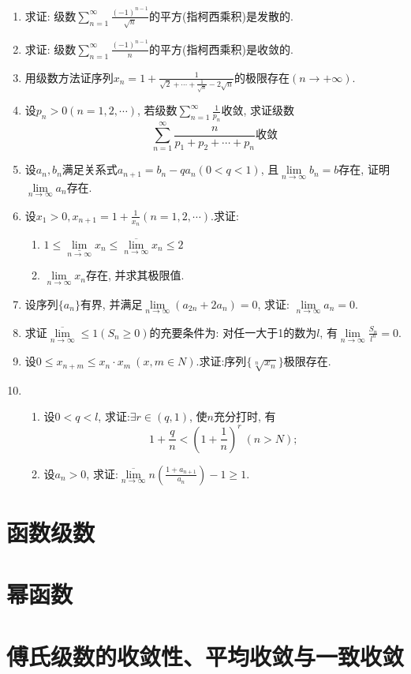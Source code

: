 \begin{enumerate}
\begin{enumerate}
\end{enumerate}
\item 求证: 级数$\sum\limits_{n=1}^{\infty}\frac{(-1)^{n-1}}{\sqrt{n}}$的平方(指柯西乘积)是发散的.
\item 求证: 级数$\sum\limits_{n=1}^{\infty}\frac{(-1)^{n-1}}{n}$的平方(指柯西乘积)是收敛的.
\item 用级数方法证序列$x_n=1+\frac{1}{\sqrt{2}+\cdots+\frac{1}{\sqrt{n}}-2\sqrt{n}}$的极限存在$(n\rightarrow +\infty)$.
\item 设$p_n>0(n=1,2,\cdots)$, 若级数$\sum\limits_{n=1}^{\infty}\frac{1}{p_n}$收敛, 求证级数
$$ \sum\limits_{n=1}^{\infty}\frac{n}{p_1+p_2+\cdots+p_n}\textbf{收敛}$$
\item 设${a_n},{b_n}$满足关系式$a_{n+1}=b_n-qa_n(0<q<1)$, 且$\lim\limits_{n\rightarrow \infty}b_n=b$存在, 证明$\lim\limits_{n\rightarrow \infty}a_n$存在.
\item 设$x_1>0,x_{n+1}=1+\frac{1}{x_n}(n=1,2,\cdots)$.求证:
\begin{enumerate}
	\item $1\le \underset{n\rightarrow \infty}{\underline{\lim}}x_n\le \overline{\lim\limits_{n\rightarrow \infty}}x_n\le 2$
	\item $\lim\limits_{n\rightarrow \infty}x_n$存在, 并求其极限值.
\end{enumerate}
\item 设序列$\{a_n\}$有界, 并满足$\lim\limits_{n\rightarrow \infty}(a_{2n}+2a_n)=0$, 求证: $\lim\limits_{n\rightarrow \infty}a_n=0$.
\item 求证$\overline{\lim\limits_{n\rightarrow \infty}}\le 1(S_n\ge 0)$的充要条件为: 对任一大于1的数为$l$, 有$\lim\limits_{n\rightarrow \infty}\frac{S_n}{l^n}=0$.
\item 设$0\le x_{n+m}\le x_n \cdot x_m\ (x,m\in N)$.求证:序列$\{\sqrt[n]{x_n}\}$极限存在.
\item 
\begin{enumerate}
	\item 设$0<q<l$, 求证:$\exists r\in (q,1)$, 使$n$充分打时, 有$$
	1+\frac{q}{n}<(1+\frac{1}{n})^r\ (n>N);
	$$
	\item 设$a_n>0$, 求证:$\overline{\lim\limits_{n\rightarrow \infty}}n(\frac{1+a_{n+1}}{a_n})-1\ge 1$.
\end{enumerate}
\end{enumerate}

\section{函数级数}

\section{幂函数}

\section{傅氏级数的收敛性、平均收敛与一致收敛}